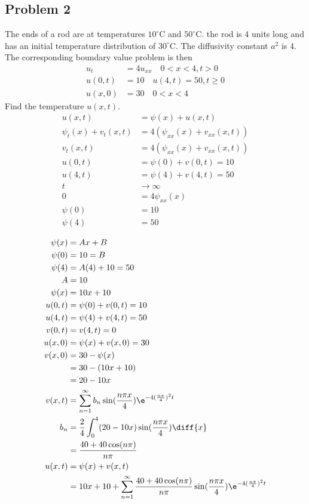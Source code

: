 \documentclass{math}
\begin{document}
\subsection*{Problem 2}
The ends of a rod are at temperatures \( 10^{\circ} \)C and \( 50^{\circ} \)C.
the rod is 4 units long and has an initial temperature distribution of
\( 30^{\circ} \)C. The diffusivity constant \( a^2 \) is 4. The corresponding
boundary value problem is then
\begin{align*}
  u_t &= 4u_{xx} \quad 0<x<4,t>0 \\
  u(0,t) &= 10 \quad u(4,t) = 50, t\ge 0 \\
  u(x,0) &= 30 \quad 0<x<4
\end{align*}
Find the temperature \( u(x,t) \).
\begin{align*}
  u(x,t) &= \psi(x)+u(x,t) \\
  \psi_t(x)+v_t(x,t) &= 4(\psi_{xx}(x)+v_{xx}(x,t)) \\
  v_t(x,t) &= 4(\psi_{xx}(x)+v_{xx}(x,t)) \\
  u(0,t) &= \psi(0)+v(0,t) = 10 \\
  u(4,t) &= \psi(4)+v(4,t) = 50 \\
  t&\to\infty \\
  0 &= 4\psi_{xx}(x) \\
  \psi(0) &= 10 \\
  \psi(4) &= 50 \\
\end{align*}
\begin{align*}
  \psi(x) &= Ax+B \\
  \psi(0) &= 10 = B \\
  \psi(4) &= A(4)+10 = 50 \\
  A &= 10 \\
  \psi(x) &= 10x+10 \\
  u(0,t) &= \psi(0)+v(0,t) = 10 \\
  u(4,t) &= \psi(4)+v(4,t) = 50 \\
  v(0,t) &= v(4,t) = 0 \\
  u(x,0) &= \psi(x)+v(x,0) = 30 \\
  v(x,0) &= 30-\psi(x) \\
  &= 30-(10x+10) \\
  &= 20-10x \\
  v(x,t) &= \sum_{n=1}^{\infty}
    b_n\sin(\frac{n\pi x}{4})\e^{-4(\frac{n\pi}{4})^2t} \\
  b_n &= \frac{2}{4}\int_{0}^{4}(20-10x)\sin(\frac{n\pi x}{4})\diff{x} \\
  &= \frac{40+40\cos(n\pi)}{n\pi} \\
  u(x,t) &= \psi(x)+v(x,t) \\
  &= 10x+10+\sum_{n=1}^{\infty}
    \frac{40+40\cos(n\pi)}{n\pi}
    \sin(\frac{n\pi x}{4})\e^{-4(\frac{n\pi}{4})^2t} \\
\end{align*}
\end{document}
